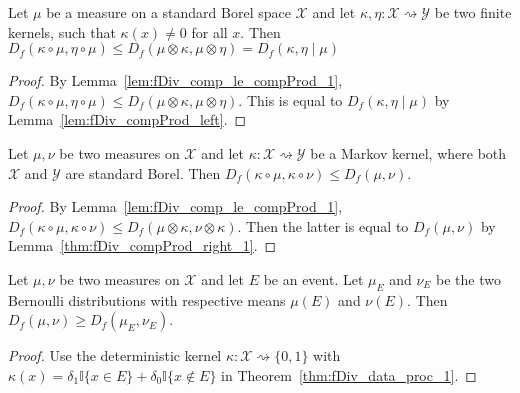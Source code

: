 \begin{theorem}
  \label{thm:fDiv_comp_le_condFDiv_1}
  \leanok
  Let $\mu$ be a measure on a standard Borel space $\mathcal X$ and let $\kappa, \eta : \mathcal X \rightsquigarrow \mathcal Y$ be two finite kernels, such that $\kappa(x) \ne 0$ for all $x$.
  Then $D_f(\kappa \circ \mu, \eta \circ \mu) \le D_f(\mu \otimes \kappa, \mu \otimes \eta) = D_f(\kappa, \eta \mid \mu)$
\end{theorem}

\begin{proof}\leanok
{}
By Lemma~\ref{lem:fDiv_comp_le_compProd_1}, $D_f(\kappa \circ \mu, \eta \circ \mu) \le D_f(\mu \otimes \kappa, \mu \otimes \eta)$. This is equal to $D_f(\kappa, \eta \mid \mu)$ by Lemma~\ref{lem:fDiv_compProd_left}.
\end{proof}

\begin{theorem}
  \label{thm:fDiv_data_proc_1}
  \leanok
  Let $\mu, \nu$ be two measures on $\mathcal X$ and let $\kappa : \mathcal X \rightsquigarrow \mathcal Y$ be a Markov kernel, where both $\mathcal X$ and $\mathcal Y$ are standard Borel.
  Then $D_f(\kappa \circ \mu, \kappa \circ \nu) \le D_f(\mu, \nu)$.
\end{theorem}

\begin{proof}\leanok
{}
By Lemma~\ref{lem:fDiv_comp_le_compProd_1}, $D_f(\kappa \circ \mu, \kappa \circ \nu) \le D_f(\mu \otimes \kappa, \nu \otimes \kappa)$. Then the latter is equal to $D_f(\mu, \nu)$ by Lemma~\ref{thm:fDiv_compProd_right_1}.
\end{proof}


\begin{corollary}
  \label{cor:data_proc_event}
  Let $\mu, \nu$ be two measures on $\mathcal X$ and let $E$ be an event. Let $\mu_E$ and $\nu_E$ be the two Bernoulli distributions with respective means $\mu(E)$ and $\nu(E)$. Then $D_f(\mu, \nu) \ge D_f(\mu_E, \nu_E)$.
\end{corollary}

\begin{proof}
Use the deterministic kernel $\kappa : \mathcal X \rightsquigarrow \{0, 1\}$ with $\kappa(x) = \delta_1 \mathbb{I}\{x \in E\} + \delta_0 \mathbb{I}\{x \notin E\}$ in Theorem~\ref{thm:fDiv_data_proc_1}.
\end{proof}

